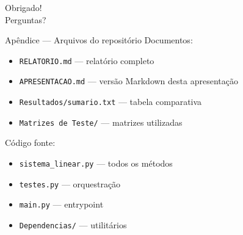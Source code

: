 \documentclass[10pt,aspectratio=169]{beamer}
\begin{document}
\begin{frame}[standout]
  Obrigado!\\[0.6em]
  {\large Perguntas?}
\end{frame}

\appendix

\begin{frame}{Apêndice --- Arquivos do repositório}
  \small
  Documentos:
  \begin{itemize}
    \item \texttt{RELATORIO.md} --- relatório completo
    \item \texttt{APRESENTACAO.md} --- versão Markdown desta apresentação
    \item \texttt{Resultados/sumario.txt} --- tabela comparativa
    \item \texttt{Matrizes de Teste/} --- matrizes utilizadas
  \end{itemize}

  \vspace{0.6em}
  Código fonte:
  \begin{itemize}
    \item \texttt{sistema\_linear.py} --- todos os métodos
    \item \texttt{testes.py} --- orquestração
    \item \texttt{main.py} --- entrypoint
    \item \texttt{Dependencias/} --- utilitários
  \end{itemize}
\end{frame}
\end{document}
